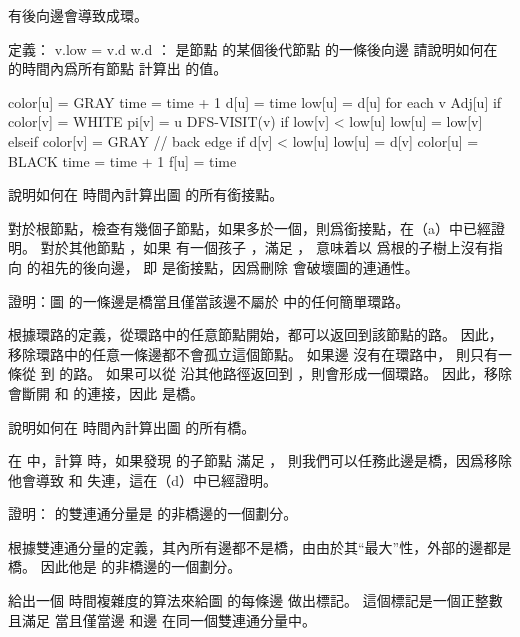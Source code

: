 \startANSWER
有後向邊會導致成環。
\stopANSWER

\startigBase[continue]\startitem
定義：
\startformula
v.low = \min \startcases
\NC v.d \NC \NR
\NC w.d \NC ： 是節點  的某個後代節點  的一條後向邊\NR
\stopcases
\stopformula
請說明如何在  的時間內爲所有節點  計算出  的值。
\stopitem\stopigBase

\startANSWER
{}
\startCLRS
color[u] = GRAY
time = time + 1
d[u] = time
low[u] = d[u]
for each v Adj[u]
	if color[v] = WHITE
		pi[v] = u
		DFS-VISIT(v)
		if low[v] < low[u]
			low[u] = low[v]
	elseif color[v] = GRAY		// back edge
		if d[v] < low[u]
			low[u] = d[v]
color[u] = BLACK
time = time + 1
f[u] = time
\stopCLRS
\stopANSWER

\startigBase[continue]\startitem
說明如何在  時間內計算出圖  的所有銜接點。
\stopitem\stopigBase

\startANSWER
對於根節點，檢查有幾個子節點，如果多於一個，則爲銜接點，在（a）中已經證明。
對於其他節點 ，如果  有一個孩子 ，滿足 ，
意味着以  爲根的子樹上沒有指向  的祖先的後向邊，
即  是銜接點，因爲刪除  會破壞圖的連通性。
\stopANSWER

\startigBase[continue]\startitem
證明：圖  的一條邊是橋當且僅當該邊不屬於  中的任何簡單環路。
\stopitem\stopigBase

\startANSWER
根據環路的定義，從環路中的任意節點開始，都可以返回到該節點的路。
因此，移除環路中的任意一條邊都不會孤立這個節點。
如果邊  沒有在環路中，
則只有一條從  到  的路。
如果可以從  沿其他路徑返回到 ，則會形成一個環路。
因此，移除  會斷開  和  的連接，因此  是橋。
\stopANSWER

\startigBase[continue]\startitem
說明如何在  時間內計算出圖  的所有橋。
\stopitem\stopigBase

\startANSWER
在  中，計算  時，如果發現  的子節點  滿足 ，
則我們可以任務此邊是橋，因爲移除他會導致  和  失連，這在（d）中已經證明。
\stopANSWER

\startigBase[continue]\startitem
證明：  的雙連通分量是  的非橋邊的一個劃分。
\stopitem\stopigBase

\startANSWER
根據雙連通分量的定義，其內所有邊都不是橋，由由於其“最大”性，外部的邊都是橋。
因此他是  的非橋邊的一個劃分。
\stopANSWER

\startigBase[continue]\startitem
給出一個  時間複雜度的算法來給圖  的每條邊  做出標記。
這個標記是一個正整數  且滿足  當且僅當邊  和邊  在同一個雙連通分量中。
\stopitem\stopigBase

